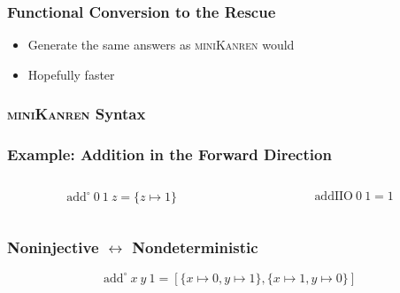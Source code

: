 \documentclass[xcolor=table, aspectratio=169]{beamer}
\newcommand{\mk}{\textsc{miniKanren}\xspace}
\begin{document}
\begin{frame}[fragile]
  \frametitle{Functional Conversion to the Rescue}
\begin{center}
  
\end{center}

\vfill

\begin{center}
  \begin{minipage}{0.4\textwidth}
    \begin{itemize}
      \item Generate the same answers as \mk would
      \item Hopefully faster
    \end{itemize}
  \end{minipage}
\end{center}
\end{frame}

\begin{frame}[fragile]
  \frametitle{\mk Syntax}
\begin{center}
  
\end{center}
\end{frame}

\begin{frame}[fragile]
  \frametitle{Example: Addition in the Forward Direction}
\begin{columns}
  \begin{column}[t]{0.49\textwidth}
    
    \[ \text{add}^{\circ}\ 0\ 1\ z = \{z \mapsto 1\}\]
  \end{column}
  \begin{column}[t]{0.49\textwidth}
    
    \[ \text{addIIO}\ 0\ 1 = 1 \] 
  \end{column}
\end{columns}
\end{frame}

\begin{frame}[fragile]
  \frametitle{Noninjective $\leftrightarrow$ Nondeterministic}


\vfill

\begin{center}
    \[ \text{add}^{\circ}\ x\ y\ 1 = \left[\{x \mapsto  0, y \mapsto 1\}, \{x \mapsto  1, y \mapsto  0\} \right] \] 
\end{center}
\end{frame}
\end{document}
